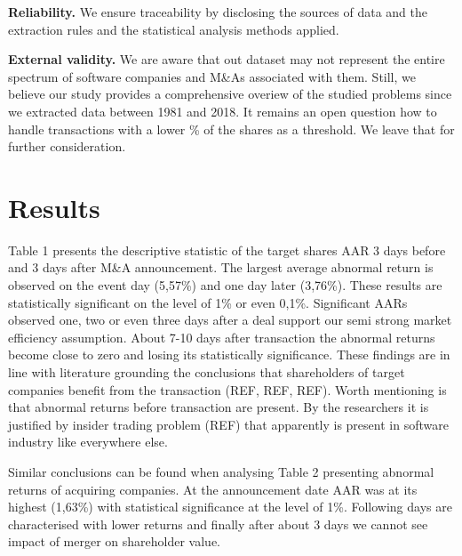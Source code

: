 \documentclass[preprint,10pt]{elsarticle}
\begin{document}
\textbf{Reliability.} We ensure traceability by disclosing the sources of data and the extraction rules and the statistical analysis methods applied. 

\textbf{External validity.} We are aware that out dataset may not represent the entire spectrum of software companies and M\&As associated with them. Still, we believe our study provides a comprehensive overiew of the studied problems since we extracted data between 1981 and 2018. It remains an open question how to handle transactions with a lower \% of the shares as a threshold. We leave that for further consideration. 


\section{Results}\label{Results}


Table 1 presents the descriptive statistic of the target shares AAR 3 days before and 3 days after M\&A announcement. The largest average abnormal return is observed on the event day (5,57\%) and one day later (3,76\%). These results are statistically significant on the level of 1\% or even 0,1\%. Significant AARs observed one, two or even three days after a deal support our semi strong market efficiency assumption. About 7-10 days after transaction the abnormal returns become close to zero and losing its statistically significance. These findings are in line with literature grounding the conclusions that shareholders of target companies benefit from the transaction (REF, REF, REF).
Worth mentioning is that abnormal returns before transaction are present. By the researchers it is justified by insider trading problem (REF) that apparently is present in software industry like everywhere else.



Similar conclusions can be found when analysing Table 2 presenting abnormal returns of acquiring companies. At the announcement date AAR was at its highest (1,63\%) with statistical significance at the level of 1\%. Following days are characterised with lower returns and finally after about 3 days we cannot see impact of merger on shareholder value.
\end{document}
